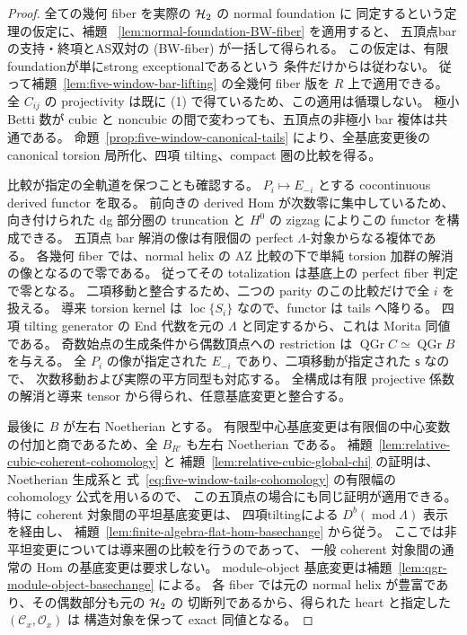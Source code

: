 \begin{proof}
全ての幾何 fiber を実際の $\mathcal H_2$ の normal foundation に
同定するという定理の仮定に、補題~
\ref{lem:normal-foundation-BW-fiber} を適用すると、
五頂点barの支持・終項とAS双対の (BW-fiber) が一括して得られる。
この仮定は、有限foundationが単にstrong exceptionalであるという
条件だけからは従わない。
従って補題~\ref{lem:five-window-bar-lifting} の全幾何 fiber 版を
$R$ 上で適用できる。
全 $C_{ij}$ の projectivity は既に (1) で得ているため、この適用は循環しない。
極小 Betti 数が cubic と noncubic の間で変わっても、五頂点の非極小 bar 複体は共通である。
命題~\ref{prop:five-window-canonical-tails} により、全基底変更後の
canonical torsion 局所化、四項 tilting、compact 圏の比較を得る。

比較が指定の全軌道を保つことも確認する。
$P_i\mapsto E_{-i}$ とする cocontinuous derived functor を取る。
前向きの derived Hom が次数零に集中しているため、向き付けられた dg 部分圏の
truncation と $H^0$ の zigzag によりこの functor を構成できる。
五頂点 bar 解消の像は有限個の perfect $\Lambda$-対象からなる複体である。
各幾何 fiber では、normal helix の AZ 比較の下で単純 torsion 加群の解消の像となるので零である。
従ってその totalization は基底上の perfect fiber 判定で零となる。
二項移動と整合するため、二つの parity のこの比較だけで全 $i$ を扱える。
導来 torsion kernel は $\operatorname{loc}\{S_i\}$ なので、functor は tails へ降りる。
四項 tilting generator の End 代数を元の $\Lambda$ と同定するから、これは Morita 同値である。
奇数始点の生成条件から偶数頂点への restriction は
$\operatorname{QGr}C\simeq\operatorname{QGr}B$ を与える。
全 $P_i$ の像が指定された $E_{-i}$ であり、二項移動が指定された $\mathsf s$ なので、
次数移動および実際の平方同型も対応する。
全構成は有限 projective 係数の解消と導来 tensor から得られ、任意基底変更と整合する。

最後に $B$ が左右 Noetherian とする。
有限型中心基底変更は有限個の中心変数の付加と商であるため、全 $B_{R'}$ も左右 Noetherian である。
補題~\ref{lem:relative-cubic-coherent-cohomology} と
補題~\ref{lem:relative-cubic-global-chi} の証明は、Noetherian 生成系と
式~\ref{eq:five-window-tails-cohomology} の有限幅の cohomology 公式を用いるので、
この五頂点の場合にも同じ証明が適用できる。
特に coherent 対象間の平坦基底変更は、
四項tiltingによる $D^b(\operatorname{mod}\Lambda)$ 表示を経由し、
補題~\ref{lem:finite-algebra-flat-hom-basechange} から従う。
ここでは非平坦変更については導来圏の比較を行うのであって、
一般 coherent 対象間の通常の Hom の基底変更は要求しない。
module-object 基底変更は補題~\ref{lem:qgr-module-object-basechange} による。
各 fiber では元の normal helix が豊富であり、その偶数部分も元の $\mathcal H_2$ の
切断列であるから、得られた heart と指定した $(\mathcal C_x,\mathcal O_x)$ は
構造対象を保って exact 同値となる。
\end{proof}

